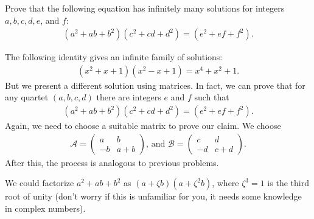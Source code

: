 \documentclass{subfile}
\begin{document}
\begin{problem}
Prove that the following equation has infinitely many solutions for integers $a,b,c,d,e$, and $f$:
\begin{align*}
(a^2+ab+b^2)(c^2+cd+d^2)=(e^2+ef+f^2).
\end{align*}
\end{problem}

\begin{solution}
The following identity gives an infinite family of solutions:
\begin{align*}
(x^2+x+1)(x^2-x+1)=x^4+x^2+1.
\end{align*}
But we present a different solution using matrices. In fact, we can prove that for any quartet $(a,b,c,d)$ there are integers $e$ and $f$ such that
\begin{align*}
(a^2+ab+b^2)(c^2+cd+d^2)=(e^2+ef+f^2).
\end{align*}
Again, we need to choose a suitable matrix to prove our claim. We choose
\begin{align*}
\mathcal{A}=\begin{pmatrix}
a & b\\
-b & a+b
\end{pmatrix}\text{, and }
\mathcal{B}=\begin{pmatrix}
c & d\\
-d & c+d
\end{pmatrix}.
\end{align*}
After this, the process is analogous to previous problems.
\end{solution}

\begin{note}
We could factorize $a^2+ab+b^2$ as $(a+\zeta b)(a+\zeta^2b)$, where $\zeta^3=1$ is the third root of unity (don't worry if this is unfamiliar for you, it needs some knowledge in complex numbers).
\end{note}
\end{document}
